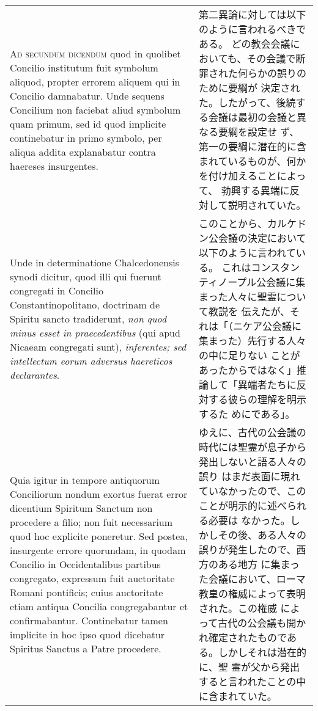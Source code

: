 \documentclass[10pt]{jsarticle} %
\begin{document}
\begin{longtable}{p{21em}p{21em}}
\\



{\scshape Ad secundum dicendum} quod in quolibet Concilio institutum fuit
symbolum aliquod, propter errorem aliquem qui in Concilio
damnabatur. Unde sequens Concilium non faciebat aliud symbolum quam
primum, sed id quod implicite continebatur in primo symbolo, per
aliqua addita explanabatur contra haereses insurgentes. 


&

第二異論に対しては以下のように言われるべきである。
どの教会会議においても、その会議で断罪された何らかの誤りのために要綱が
 決定された。したがって、後続する会議は最初の会議と異なる要綱を設定せ
 ず、第一の要綱に潜在的に含まれているものが、何かを付け加えることによって、
 勃興する異端に反対して説明されていた。


\\

Unde in
determinatione Chalcedonensis synodi dicitur, quod illi qui fuerunt
congregati in Concilio Constantinopolitano, doctrinam de  Spiritu
sancto tradiderunt, {\itshape non quod minus esset in praecedentibus} (qui apud
Nicaeam congregati sunt), {\itshape inferentes; sed intellectum eorum adversus
haereticos declarantes}. 


&

このことから、カルケドン公会議の決定において以下のように言われている。
これはコンスタンティノープル公会議に集まった人々に聖霊について教説を
伝えたが、それは「（ニケア公会議に集まった）先行する人々の中に足りない
ことがあったからではなく」推論して「異端者たちに反対する彼らの理解を明示するた
めにである」。

\\

Quia igitur in tempore antiquorum Conciliorum
nondum exortus fuerat error dicentium  Spiritum Sanctum non procedere a
filio; non fuit necessarium quod hoc explicite poneretur. Sed postea,
insurgente errore quorundam, in quodam Concilio in Occidentalibus
partibus congregato, expressum fuit auctoritate Romani pontificis;
cuius auctoritate etiam antiqua Concilia congregabantur et
confirmabantur. Continebatur tamen implicite in hoc ipso quod
dicebatur Spiritus Sanctus a Patre procedere.

&

ゆえに、古代の公会議の時代には聖霊が息子から発出しないと語る人々の誤り
 はまだ表面に現れていなかったので、このことが明示的に述べられる必要は
 なかった。しかしその後、ある人々の誤りが発生したので、西方のある地方
 に集まった会議において、ローマ教皇の権威によって表明された。この権威
 によって古代の公会議も開かれ確定されたものである。しかしそれは潜在的に、聖
 霊が父から発出すると言われたことの中に含まれていた。


\end{longtable}
\end{document}
